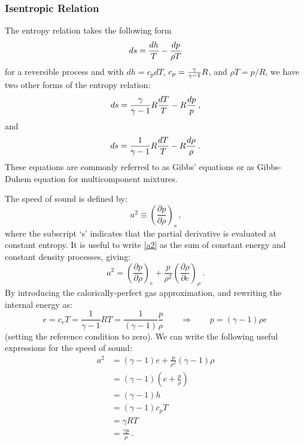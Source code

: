 \subsubsection{Isentropic Relation}
The entropy relation takes the following form
\begin{equation}
  ds = {\frac{dh}{T}} - {\frac{dp}{\rho T}}
\end{equation}
for a reversible process and with $dh = c_p dT$, $c_p = {\frac{\gamma}{\gamma-1}}R$, and $\rho T = p/R$, we have two other forms of the entropy relation:
\begin{equation}
  ds = {\frac{\gamma}{\gamma-1}}R {\frac{dT}{T}} - R {\frac{dp}{p}}\,,
\end{equation}
and
\begin{equation}
  ds = {\frac{1}{\gamma-1}}R {\frac{dT}{T}} - R {\frac{d\rho}{\rho}}\,.
\end{equation}
These equations are commonly referred to as Gibbs' equations or as Gibbs-Duhem equation for multicomponent mixtures.

The speed of sound is defined by:
\begin{equation}\label{a2}
  a^2 \equiv \left( \frac{\partial p}{\partial \rho} \right)_s \, \text{,}
\end{equation}
where the subscript `s' indicates that the partial derivative is evaluated at constant entropy. It is useful to write \cref{a2} as the sum of constant energy and constant density processes, giving:
\begin{equation}
a^2 = \left(\frac{\partial p}{\partial \rho} \right)_e +
\frac{p}{\rho^2} \left(\frac{\partial \rho}{\partial e}
\right)_\rho \, \text{.}
\end{equation}
By introducing the calorically-perfect gas approximation, and rewriting the internal energy as:
\begin{equation}
e = c_v T = \frac{1}{\gamma-1}RT = \frac{1}{(\gamma -
1)}\frac{p}{\rho}\qquad\Rightarrow\qquad
p = (\gamma -1) \rho e \,
\end{equation}
(setting the reference condition to zero). We can write the following useful expressions for the speed of sound:
\begin{equation}
  \begin{split}
a^2 &= (\gamma-1)e + \frac{p}{\rho^2}(\gamma-1)\rho  \\
&=(\gamma-1) \left(e + \frac{p}{\rho} \right) \\
&= (\gamma - 1)h\\
&= (\gamma-1)c_p T  \\
&= \gamma R T  \\
&= \frac{\gamma p}{\rho} \, \text{.}
  \end{split}
\end{equation}


